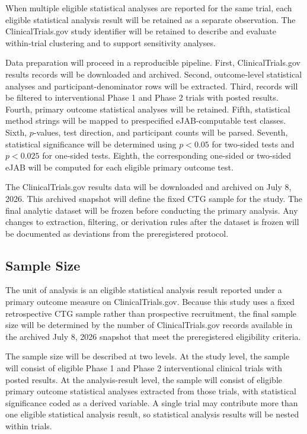 \documentclass[11pt]{article}
\begin{document}
When multiple eligible statistical analyses are reported for the same trial, each eligible statistical analysis result will be retained as a separate observation. The ClinicalTrials.gov study identifier will be retained to describe and evaluate within-trial clustering and to support sensitivity analyses.

Data preparation will proceed in a reproducible pipeline. First, ClinicalTrials.gov results records will be downloaded and archived. Second, outcome-level statistical analyses and participant-denominator rows will be extracted. Third, records will be filtered to interventional Phase 1 and Phase 2 trials with posted results. Fourth, primary outcome statistical analyses will be retained. Fifth, statistical method strings will be mapped to prespecified eJAB-computable test classes. Sixth, \(p\)-values, test direction, and participant counts will be parsed. Seventh, statistical significance will be determined using \(p < 0.05\) for two-sided tests and \(p < 0.025\) for one-sided tests. Eighth, the corresponding one-sided or two-sided eJAB will be computed for each eligible primary outcome test.

The ClinicalTrials.gov results data will be downloaded and archived on July 8, 2026. This archived snapshot will define the fixed CTG sample for the study. The final analytic dataset will be frozen before conducting the primary analysis. Any changes to extraction, filtering, or derivation rules after the dataset is frozen will be documented as deviations from the preregistered protocol.

\subsection{Sample Size}

The unit of analysis is an eligible statistical analysis result reported under a primary outcome measure on ClinicalTrials.gov. Because this study uses a fixed retrospective CTG sample rather than prospective recruitment, the final sample size will be determined by the number of ClinicalTrials.gov records available in the archived July 8, 2026 snapshot that meet the preregistered eligibility criteria.

The sample size will be described at two levels. At the study level, the sample will consist of eligible Phase 1 and Phase 2 interventional clinical trials with posted results. At the analysis-result level, the sample will consist of eligible primary outcome statistical analyses extracted from those trials, with statistical significance coded as a derived variable. A single trial may contribute more than one eligible statistical analysis result, so statistical analysis results will be nested within trials.
\end{document}

